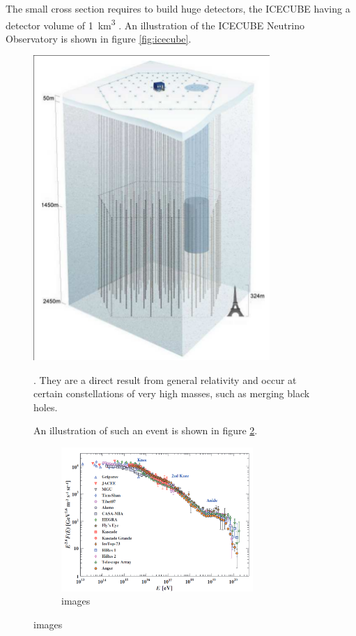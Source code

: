The small cross section requires to build huge detectors, 
the ICECUBE having a detector volume of \SI{1}{\kilo\meter^3}
\cite{Abbasi:2008aa}.
An illustration of the ICECUBE Neutrino Observatory
is shown in figure \ref{fig:icecube}.
\begin{figure}
	\centering
	\includegraphics[width=0.8\textwidth]{images/icecube.png}
	\caption{icecube illustration, cite that \cite{Abbasi:2008aa}}
	\label{fig:icecube}
\endrvation.
They are a direct result from general relativity and occur
at certain constellations of very high masses, such as 
merging black holes.

An illustration of such an event is shown in figure \ref{fig:gravi_waves}. 
\begin{figure}
	\centering
	\includegraphics[width=0.8\textwidth]{images/cr_spectrum.png}
	\caption{images}
	\label{fig:gravi_waves}
\end{figure}



\end{figure}
